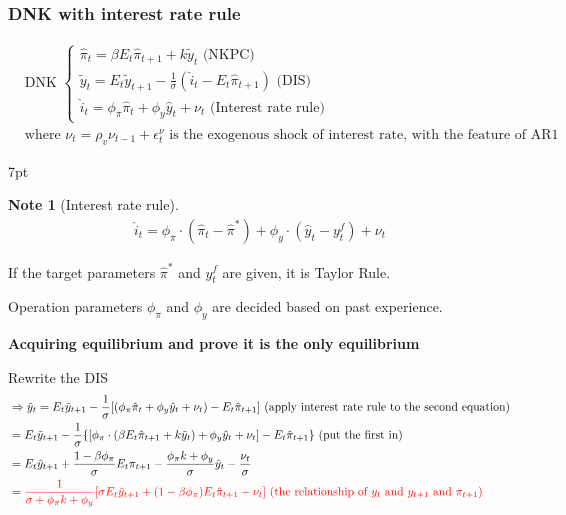 \documentclass{article}
\newenvironment{blueblock}{
\def\FrameCommand{
  \hspace{1pt}
    {\color{DarkBlue}
    \vrule width 2pt}
    {\color{blueshade}
    \vrule width 4pt}
  \colorbox{blueshade}
}
\MakeFramed{
  \advance
  \hsize-
  \width
  \FrameRestore}
\noindent\hspace{-4.55pt}%
\begin{adjustwidth}{}{7pt}
\vspace{2pt}\vspace{2pt}
}
{\vspace{2pt}\end{adjustwidth}\endMakeFramed}
\newtheorem{note}{Note}
\begin{document}
\subsubsection{DNK with interest rate rule} 

\begin{align}
&\text{DNK } \begin{cases}
\hat \pi_t = \beta E_t \hat \pi_{t+1}+k \tilde y_t  \text{ (NKPC)}
\\
\tilde y_t=E_t \tilde y_{t+1} -\frac{1}{\sigma}(\hat i_t - E_t \hat \pi_{t+1}) \text{ (DIS)}
\\
\hat i_t = \phi_\pi \hat \pi_t  +\phi_y \hat y_t  +\nu_t \text{ (Interest rate rule)}
\end{cases}
\\& \text{where } \nu_t =\rho_v \nu_{t-1}+\epsilon^\nu_t \text{ is the exogenous shock of interest rate, with the feature of AR1} 
\end{align}

\begin{blueblock}
\begin{note}[Interest rate rule]
\begin{align}
\hat i_t = \phi_\pi \cdot (\hat \pi_t -\hat \pi^*)+\phi_y \cdot (\hat y_t -y_t^f)+\nu_t
\end{align} 
\end{note}

If the target parameters $\hat \pi^*$ and $y_t^f$ are given, it is Taylor Rule.

Operation parameters $\phi_\pi$ and $\phi_y$ are decided based on past experience.
\end{blueblock}


\textbf{Acquiring equilibrium and prove it is the only equilibrium}

Rewrite the DIS
\begin{align}
&\Rightarrow \tilde y_t=E_t \tilde y_{t+1} -\frac{1}{\sigma}[(\phi_\pi \hat \pi_t  +\phi_y \hat y_t  +\nu_t ) - E_t \hat \pi_{t+1}]
\text{ (apply interest rate rule to the second equation)}
\\& = E_t \tilde y_{t+1} -\frac{1}{\sigma}\{[\phi_\pi \cdot (\beta E_t \hat \pi_{t+1}+k \tilde y_t)  +\phi_y \hat y_t  +\nu_t ] - E_t \hat \pi_{t+1}\}
\text{ (put the first in)}
\\& = E_t \tilde y_{t+1}+ \frac{1-\beta \phi_\pi}{\sigma}E_t \pi_{t+1}-\frac{\phi_\pi k+\phi_y}{\sigma} \tilde y_t - \frac{\nu_t}{\sigma}
\\& = \color{red} \frac{1}{\sigma+\phi_\pi k + \phi_y}[\sigma E_t \tilde y_{t+1}+(1-\beta \phi_\pi)E_t \hat \pi_{t+1}-\nu_t]
\text{ (the relationship of $y_t$ and $y_{t+1}$ and $\pi_{t+1}$)}
\end{align}
\end{document}

